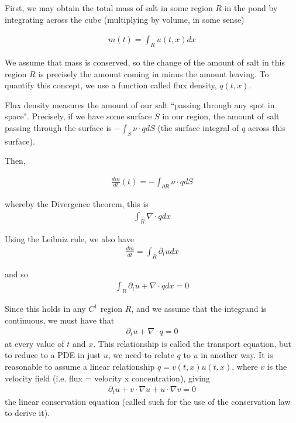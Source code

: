 \documentclass{article}
\newcommand{\pd}{\partial}
\begin{document}
	 First, we may obtain the total mass of salt in some region $R$ in the pond by integrating across the cube (multiplying by volume, in some sense)
	
	\begin{align*}
		m(t) = \int_{R} u(t,x)dx
	\end{align*} 
	
	We assume that mass is conserved, so the change of the amount of salt in this region $R$ is precisely the amount coming in minus the amount leaving. To quantify this concept, we use a function called flux density, $q(t,x)$. 
	
	Flux density measures the amount of our salt ``passing through any spot in space". Precisely, if we have some surface $S$ in our region, the amount of salt passing through the surface is $-\int_{S} \nu \cdot q dS$ (the surface integral of $q$ across this surface). 
	
	 Then,
	
	\begin{align*}
		\frac{dm}{dt}(t) = - \int_{\pd R} \nu \cdot q dS
	\end{align*}
	
	whereby the Divergence theorem, this is 
	\begin{align*}
		\int_{R}\nabla \cdot q dx
	\end{align*}
	
	Using the Leibniz rule, we also have 
	\begin{align*}
		\frac{dm}{dt} = \int_{R} \pd_{t} u dx
	\end{align*}
	
	and so 
	\begin{align*}
		\int_{R} \pd_{t} u + \nabla \cdot q dx = 0
	\end{align*}
	
	Since this holds in any $C^{1}$ region $R$, and we assume that the integrand is continuous, we must have that 
	\begin{align*}
	\pd_{t} u + \nabla \cdot q = 0
	\end{align*}
	at every value of $t$ and $x$. This relationship is called the transport equation, but to reduce to a PDE in just $u$, we need to relate $q$ to $u$ in another way. It is reasonable to assume a linear relationship $q = v(t,x)u(t,x)$, where $v$ is the velocity field (i.e. flux = velocity x concentration), giving 
	\begin{align*}
		\pd_{t}u + v\cdot \nabla u + u \cdot \nabla v = 0
	\end{align*}
	the linear conservation equation (called such for the use of the conservation law to derive it).
	
\end{document}
